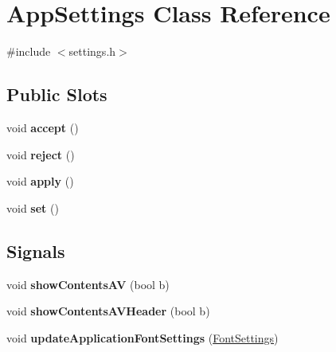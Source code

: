 \hypertarget{classAppSettings}{
\section{AppSettings Class Reference}
\label{classAppSettings}
}


{\ttfamily \#include $<$settings.h$>$}

\subsection*{Public Slots}
\begin{DoxyCompactItemize}
\item 
\hypertarget{classAppSettings_aa83c3b94303c4d9f362b4fbc570c82c5}{
void {\bfseries accept} ()}
\label{classAppSettings_aa83c3b94303c4d9f362b4fbc570c82c5}

\item 
\hypertarget{classAppSettings_a49452a32914894aa33460f3e406226f9}{
void {\bfseries reject} ()}
\label{classAppSettings_a49452a32914894aa33460f3e406226f9}

\item 
\hypertarget{classAppSettings_aaaf86e14412c4f971905d2b0dc007e99}{
void {\bfseries apply} ()}
\label{classAppSettings_aaaf86e14412c4f971905d2b0dc007e99}

\item 
\hypertarget{classAppSettings_a742c9af7cd6b980ce4f452e9a85587ab}{
void {\bfseries set} ()}
\label{classAppSettings_a742c9af7cd6b980ce4f452e9a85587ab}

\end{DoxyCompactItemize}
\subsection*{Signals}
\begin{DoxyCompactItemize}
\item 
\hypertarget{classAppSettings_aedfab9c85ff1decd27f7e10316f6a5a2}{
void {\bfseries showContentsAV} (bool b)}
\label{classAppSettings_aedfab9c85ff1decd27f7e10316f6a5a2}

\item 
\hypertarget{classAppSettings_a51da83d4eb63c767f39128b716d77f48}{
void {\bfseries showContentsAVHeader} (bool b)}
\label{classAppSettings_a51da83d4eb63c767f39128b716d77f48}

\item 
\hypertarget{classAppSettings_ad3eed2c9bdae6305b014219357c91b45}{
void {\bfseries updateApplicationFontSettings} (\hyperlink{structFontSettings}{FontSettings})}
\label{classAppSettings_ad3eed2c9bdae6305b014219357c91b45}

\end{DoxyCompactItemize}
